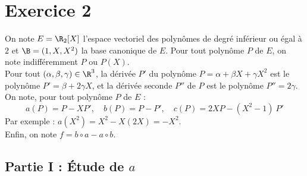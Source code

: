 \documentclass[11pt]{article}%
\begin{document}


\section*{Exercice 2}

\noindent
On note $E = \R_2[X]$ l'espace vectoriel des polynômes de degré
inférieur ou égal à $2$ et $\B = (1,X,X^2)$ la base canonique de $E$.
Pour tout polynôme $P$ de $E$, on note indifféremment $P$ ou $P(X)$.\\
Pour tout $(\alpha,\beta,\gamma)\in\R^3$, la dérivée $P'$ du polynôme
$P=\alpha+\beta X+\gamma X^2$ est le polynôme $P' = \beta+2\gamma X$,
et la dérivée seconde $P''$ de $P$ est le polynôme $P'' = 2\gamma$.\\
On note, pour tout polynôme $P$ de $E$ :
\[
a(P) = P-XP', \quad b(P) = P-P', \quad c(P) = 2XP-(X^2-1) \ P'
\]
Par exemple : $a(X^2) = X^2-X(2X) = -X^2$.\\
Enfin, on note $f = b\circ a - a \circ b$.




\subsection*{Partie I : Étude de $a$}
\end{document}
